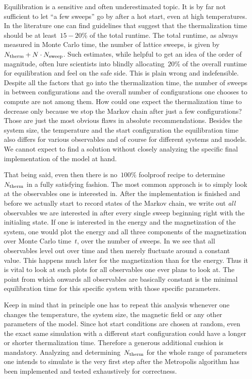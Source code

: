 Equilibration is a sensitive and often underestimated topic. It is by far not
sufficient to let ``a few sweeps'' go by after a hot start, even at high
temperatures. In the literature one can find guidelines that suggest that the
thermalization time should be at least~$15-20$\% of the total runtime. The total
runtime, as always measured in Monte Carlo time, \ie{} the number of lattice
sweeps, is given by~$N_{\mathrm{therm}} + N\cdot N_{\mathrm{sweep}}$. Such estimates, while helpful to
get an idea of the order of magnitude, often lure scientists into blindly
allocating~$20$\% of the overall runtime for equilibration and feel on the safe
side. This is plain wrong and indefensible. Despite all the factors that go into
the thermalization time, the number of sweeps in between configurations and the
overall number of configurations one chooses to compute are not among them. How
could one expect the thermalization time to decrease only because we stop the
Markov chain after just a few configurations? Those are just the most obvious
flaws in absolute recommendations. Besides the system size, the temperature and
the start configuration the equilibration time also differs for various
observables and of course for different systems and models. We cannot expect to
find a solution without closely analyzing the specific final implementation of
the model at hand.

That being said, even then there is no~$100$\% foolproof recipe to
determine~$N_{\mathrm{therm}}$ in a fully satisfying fashion. The most common approach is
to simply look at the observables one is interested in. After the implementation
is finished and before we actually start to record states of the Markov chain,
we write out \emph{all} observables we are interested in after every single
sweep beginning right with the initialing state. If one is interested in the
energy and the magnetization of the system, one would plot the energy and all
three components of the magnetization over Monte Carlo time~$t$, \ie{} over the
number of sweeps. In  we see that all observables
level out over time and then merely fluctuate around a constant value. This
happens much later for the magnetization than for the energy. Thus it is vital
to look at such plots for all observables one ever plans to look at. The point
from which onwards all observables are basically constant is the minimal
equilibration time for this specific system with those specific parameters.


Keep in mind that in principle one has to repeat this analysis whenever one
changes the temperature, the system size, the magnetic field or any other
parameters of the model. Since hot start conditions are chosen at random, even
the exact same simulation with a different start configuration could have a
longer or shorter thermalization time. Therefore a generous additional cushion
is mandatory. Analyzing and determining~$N_{\mathrm{therm}}$ for the whole range of
parameters one intends to simulate is the very first step after the Metropolis
algorithm has been implemented and tested exhaustively for correctness.

